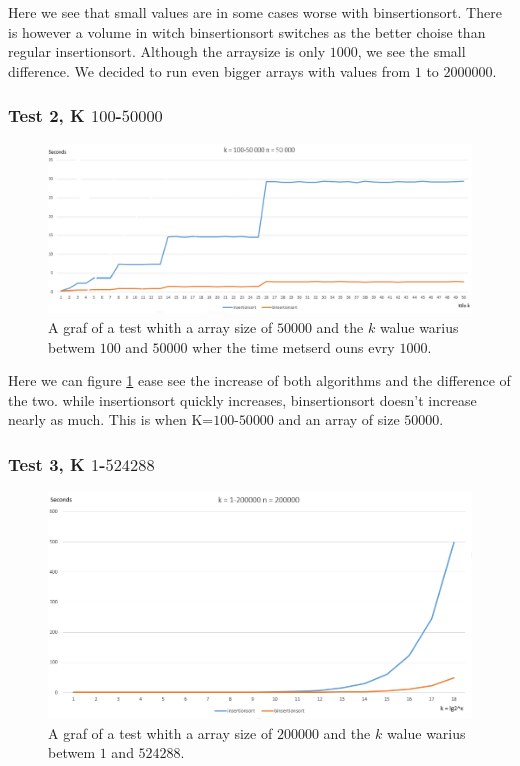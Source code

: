 \documentclass[paper=a4, fontsize=11pt]{scrartcl}
\numberwithin{equation}{section}		%
\numberwithin{figure}{section}			%
\numberwithin{table}{section}				%
\begin{document}
Here we see that small values are in some cases worse with binsertionsort. There is however a volume in witch binsertionsort switches as the better choise than regular insertionsort. Although the arraysize is only $1000$, we see the small difference. We decided to run even bigger arrays with values from $1$ to $2 000 000$.

\subsubsection{Test 2, K $100$-$50 000$}

\begin{figure}[H]
\centering
\includegraphics[width=150mm]{graf100-50000.png}
\caption{A graf of a test whith a array size of $50 000$ and the $k$ walue warius betwem $100$ and $50 000$ wher the time metserd ouns evry $1000$. \label{graf50}}
\end{figure}

Here we can figure \ref{graf50} ease see the increase of both algorithms and the difference of the two. while insertionsort quickly increases, binsertionsort doesn't increase nearly as much. This is when K=$100$-$50 000$ and an array of size $50000$.

\subsubsection{Test 3, K $1$-$524 288$}

\begin{figure}[H]
\centering
\includegraphics[width=150mm]{graf_lg1-200000.png}
\caption{A graf of a test whith a array size of $200 000$ and the $k$ walue warius betwem $1$ and $524 288$. \label{graf524}}
\end{figure}
\end{document}
